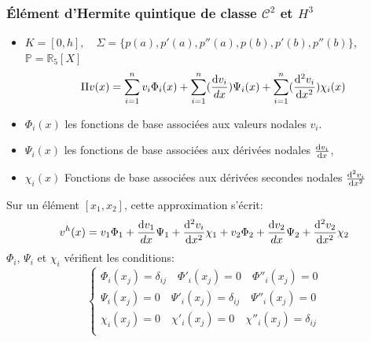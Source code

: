 \documentclass{beamer}
\def \de {{\rm d}}
\begin{document}
\begin{frame}
\frametitle{Élément d'Hermite quintique de classe $\mathcal{C}^2$ et $H^3$}

\begin{center}

\end{center}

\begin{itemize}
\item $K=[0,h],\quad\Sigma=\{p(a),p'(a),p''(a),p(b),p'(b),p''(b)\}$, $\mathbb{P}=\mathbb{R}_5[X]$
\[\Pi v (x)=\sum_{i=1}^{n}v_{i}\Phi_{i}(x)+\sum_{i=1}^{n}(\frac{\de v_i}{dx})\Psi_{i}(x)+\sum_{i=1}^{n}(\frac{\de ^2v_i}{\de x^2})\chi_{i}(x)\]
\item $\Phi_{i}(x)$ les fonctions de base associées aux valeurs nodales $v_{i}$.
\item $\Psi_{i}(x)$ les fonctions de base associées aux dérivées nodales $\frac{\de v_i}{\de x}$,
\item $\chi_{i}(x)$ Fonctions de base associées aux dérivées secondes nodales $\frac{\de ^2v_i}{\de x^2}$
\end{itemize}
Sur un élément $[x_{1},x_{2}]$, cette approximation s'écrit:
\begin{displaymath}
v^{h}(x)=v_{1}\Phi_{1}+\frac{\de v_1}{dx}\Psi_{1}+\frac{\de ^2v_i}{\de x^2}\chi_1+v_{2}\Phi_{2}+\frac{\de v_2}{dx}\Psi_{2}+\frac{\de ^2v_2}{\de x^2}\chi_2 \end{displaymath}
$\Phi_{i}$, $\Psi_i$ et $\chi_i$  vérifient les conditions:
\[\left\{\begin{array}{l}
\Phi_{i}(x_j)=\delta_{ij}\quad \Phi'_{i}(x_j)=0\quad \Phi''_{i}(x_j)=0\\
\Psi_{i}(x_j)=0\quad \Psi'_{i}(x_j)=\delta_{ij}\quad \Psi''_{i}(x_j)=0\\
\chi_{i}(x_j)=0\quad \chi'_{i}(x_j)=0\quad \chi''_{i}(x_j)=\delta_{ij}\\
\end{array} \right. \]

\end{frame}
\end{document}
